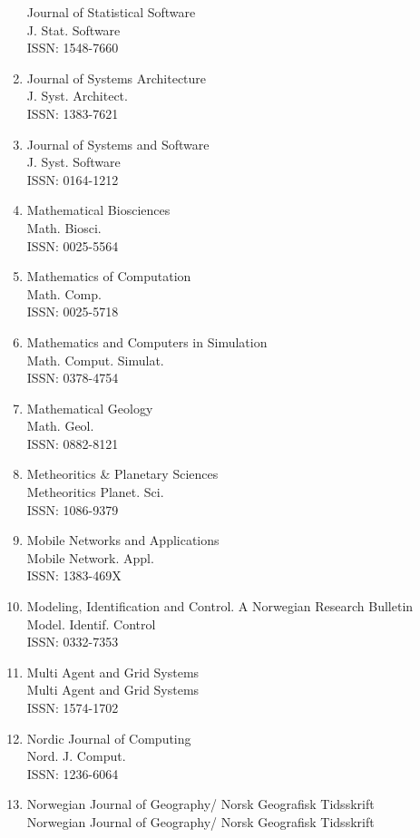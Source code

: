 \begin{enumerate}
 Journal of Statistical Software\\
 J. Stat. Software\\
 ISSN: 1548-7660
\item
 Journal of Systems Architecture\\
 J. Syst. Architect.\\
 ISSN: 1383-7621
\item
 Journal of Systems and Software\\
 J. Syst. Software\\
 ISSN: 0164-1212
\item
 Mathematical Biosciences\\
 Math. Biosci.\\
 ISSN: 0025-5564
\item
 Mathematics of Computation\\
 Math. Comp.\\
 ISSN: 0025-5718
\item
 Mathematics and Computers in Simulation\\
 Math. Comput. Simulat.\\
 ISSN: 0378-4754
\item
 Mathematical Geology\\
 Math. Geol.\\
 ISSN: 0882-8121
\item
 Metheoritics \& Planetary Sciences\\
 Metheoritics Planet. Sci.\\
 ISSN: 1086-9379
\item
 Mobile Networks and Applications\\
 Mobile Network. Appl.\\
 ISSN: 1383-469X
\item
 Modeling, Identification and Control. A Norwegian Research Bulletin\\
 Model. Identif. Control\\
 ISSN: 0332-7353
\item
 Multi Agent and Grid Systems\\
 Multi Agent and Grid Systems\\
 ISSN: 1574-1702
\item
 Nordic Journal of Computing\\
 Nord. J. Comput.\\
 ISSN: 1236-6064
\item
 Norwegian Journal of Geography/ Norsk Geografisk Tidsskrift\\
 Norwegian Journal of Geography/ Norsk Geografisk Tidsskrift\\

\end{enumerate}

